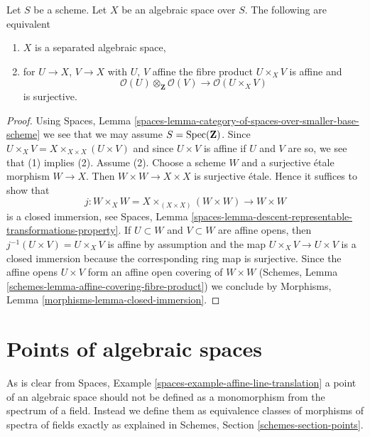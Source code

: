 \begin{lemma}
\label{lemma-characterize-separated}
Let $S$ be a scheme. Let $X$ be an algebraic space over $S$.
The following are equivalent
\begin{enumerate}
\item $X$ is a separated algebraic space,
\item for $U \to X$, $V \to X$ with $U$, $V$ affine
the fibre product $U \times_X V$ is affine and
$$
\mathcal{O}(U) \otimes_\mathbf{Z} \mathcal{O}(V)
\longrightarrow
\mathcal{O}(U \times_X V)
$$
is surjective.
\end{enumerate}
\end{lemma}

\begin{proof}
Using Spaces, Lemma
\ref{spaces-lemma-category-of-spaces-over-smaller-base-scheme}
we see that we may assume $S = \mathop{\mathrm{Spec}}(\mathbf{Z})$.
Since $U \times_X V = X \times_{X \times X} (U \times V)$
and since $U \times V$ is affine if $U$ and $V$ are so,
we see that (1) implies (2).
Assume (2). Choose a scheme $W$ and a surjective \'etale morphism
$W \to X$. Then $W \times W \to X \times X$ is surjective \'etale.
Hence it suffices to show that
$$
j : W \times_X W = X \times_{(X \times X)} (W \times W) \to W \times W
$$
is a closed immersion, see Spaces, Lemma
\ref{spaces-lemma-descent-representable-transformations-property}.
If $U \subset W$ and $V \subset W$ are affine opens, then
$j^{-1}(U \times V) = U \times_X V$ is affine by assumption
and the map $U \times_X V \to U \times V$ is a closed immersion
because the corresponding ring map is surjective.
Since the affine opens $U \times V$ form an affine open covering
of $W \times W$
(Schemes, Lemma \ref{schemes-lemma-affine-covering-fibre-product})
we conclude by
Morphisms, Lemma \ref{morphisms-lemma-closed-immersion}.
\end{proof}







\section{Points of algebraic spaces}
\label{section-points}

\noindent
As is clear from
Spaces, Example \ref{spaces-example-affine-line-translation}
a point of an algebraic space should not be defined as a monomorphism
from the spectrum of a field.
Instead we define them as equivalence classes of morphisms of spectra
of fields exactly as explained in
Schemes, Section \ref{schemes-section-points}.

